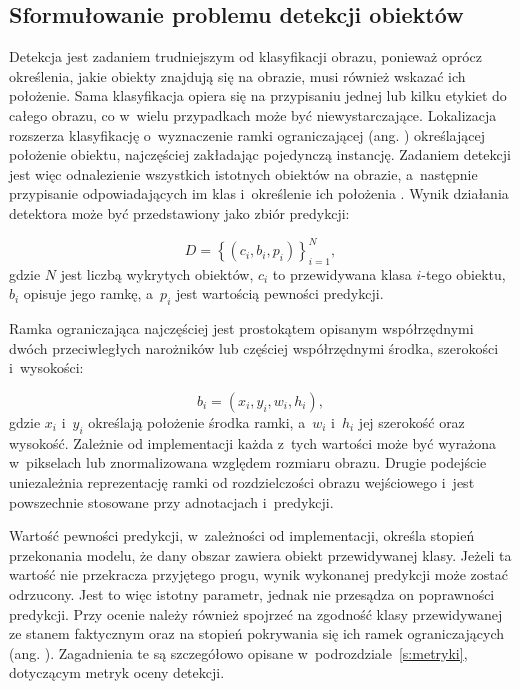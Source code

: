 \subsection{Sformułowanie problemu detekcji obiektów}

Detekcja jest zadaniem trudniejszym od klasyfikacji obrazu, ponieważ oprócz określenia, jakie obiekty znajdują się na obrazie, musi również wskazać ich położenie. Sama klasyfikacja opiera się na przypisaniu jednej lub kilku etykiet do całego obrazu, co w~wielu przypadkach może być niewystarczające. Lokalizacja rozszerza klasyfikację o~wyznaczenie ramki ograniczającej (ang. ) określającej położenie obiektu, najczęściej zakładając pojedynczą instancję. Zadaniem detekcji jest więc odnalezienie wszystkich istotnych obiektów na obrazie, a~następnie przypisanie odpowiadających im klas i~określenie ich położenia \cite{bib:redmon2016lookonceunifiedrealtime}. Wynik działania detektora może być przedstawiony jako zbiór predykcji:

\begin{equation}
    D = \left\{ \left(c_i, b_i, p_i\right) \right\}_{i=1}^{N},
\end{equation}
gdzie $N$ jest liczbą wykrytych obiektów, $c_i$ to przewidywana klasa $i$-tego obiektu, $b_i$ opisuje jego ramkę, a~$p_i$ jest wartością pewności predykcji.

Ramka ograniczająca najczęściej jest prostokątem opisanym współrzędnymi dwóch przeciwległych narożników lub częściej współrzędnymi środka, szerokości i~wysokości:

\begin{equation}
    b_i = \left(x_i, y_i, w_i, h_i\right),
\end{equation}
gdzie $x_i$ i~$y_i$ określają położenie środka ramki, a~$w_i$ i~$h_i$ jej szerokość oraz wysokość. Zależnie od implementacji każda z~tych wartości może być wyrażona w~pikselach lub znormalizowana względem rozmiaru obrazu. Drugie podejście uniezależnia reprezentację ramki od rozdzielczości obrazu wejściowego i~jest powszechnie stosowane przy adnotacjach i~predykcji.

Wartość pewności predykcji, w~zależności od implementacji, określa stopień przekonania modelu, że dany obszar zawiera obiekt przewidywanej klasy. Jeżeli ta wartość nie przekracza przyjętego progu, wynik wykonanej predykcji może zostać odrzucony. Jest to więc istotny parametr, jednak nie przesądza on poprawności predykcji. Przy ocenie należy również spojrzeć na zgodność klasy przewidywanej ze stanem faktycznym oraz na stopień pokrywania się ich ramek ograniczających (ang. ). Zagadnienia te są szczegółowo opisane w~podrozdziale~\ref{s:metryki}, dotyczącym metryk oceny detekcji.

